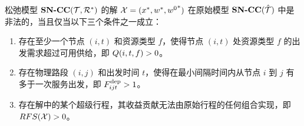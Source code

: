 \begin{theorem}
\label{thm:relax_illegal}
松弛模型 $\textbf{SN-CC}({\mathcal{T}, \mathcal{R}^{*}})$ 的解 $\mathcal{X} = (x^*, w^*, {w^0}^*)$ 在原始模型 $\textbf{SN-CC}({\hat{\mathcal{T}}})$ 中是非法的，当且仅当以下三个条件之一成立：
\begin{enumerate}
    \item 存在至少一个节点 $(i, t)$ 和资源类型 $f$，使得节点 $(i, t)$ 处资源类型 $f$ 的出发需求超过可用供给，即 $Q(i,t,f) > 0$。
    \item 存在物理路段 $(i,j)$ 和出发时间 $t$，使得在最小间隔时间内从节点 $i$ 到 $j$ 有多于一次服务出发，即 $F^{\text{dep}}_{ijt} > 1$。
    \item 存在解中的某个超级行程，其收益贡献无法由原始行程的任何组合实现，即 $RFS(\mathcal{X}) > 0$。
\end{enumerate}
\end{theorem}